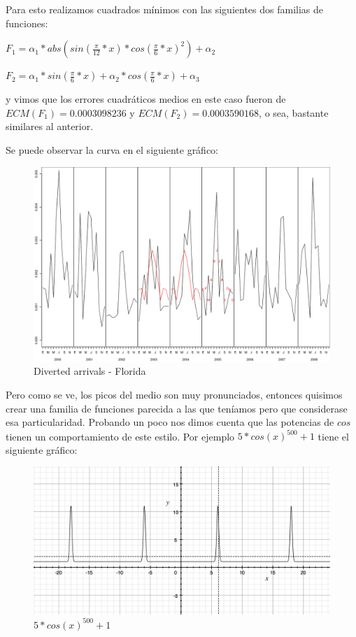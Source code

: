 Para esto realizamos cuadrados m\'inimos con las siguientes dos familias de funciones:

$F_1 = \alpha_1 * abs(sin(\frac{\pi}{12}*x) * cos(\frac{\pi}{6}*x)^2) + \alpha_2$

$F_2 = \alpha_1 * sin(\frac{\pi}{6}*x) + \alpha_2 * cos(\frac{\pi}{6}*x) + \alpha_3$

y vimos que los errores cuadr\'aticos medios en este caso fueron de $ECM(F_1) = 0.0003098236$ y $ECM(F_2) = 0.0003590168$, o sea, bastante similares al anterior.

Se puede observar la curva en el siguiente gr\'afico:

\begin{figure}[h!]
  \begin{center}
	\includegraphics[scale=0.4]{img/plot_FL_2003-2005.png}
	\caption{Diverted arrivals - Florida}
  \end{center}
\end{figure}

Pero como se ve, los picos del medio son muy pronunciados, entonces quisimos crear una familia de funciones parecida  a las que ten\'iamos pero que considerase esa particularidad.
Probando un poco nos dimos cuenta que las potencias de $cos$ tienen un comportamiento de este estilo. Por ejemplo $5*cos(x)^{500} + 1$ tiene el siguiente gr\'afico:

\begin{figure}[h!]
  \begin{center}
	\includegraphics[scale=0.4]{img/cos500.png}
	\caption{$5*cos(x)^{500} + 1$}
  \end{center}
\end{figure}

